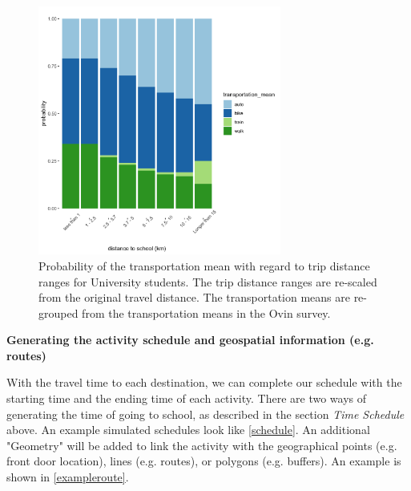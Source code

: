 \documentclass[]{article}
\begin{document}
\begin{figure}[!h]
    \centering
    \includegraphics[width=8cm]{figure/ditance_vs_transmean_Uni.png}
    \caption{Probability of the transportation mean with regard to trip distance ranges for University students. The trip distance ranges are re-scaled from the original travel distance. The transportation means are re-grouped from the transportation means in the Ovin survey.}
    \label{Uni_mode_dist}
\end{figure}

\textbf{Generating the activity schedule and geospatial information (e.g. routes)}

 With the travel time to each destination, we can complete our schedule with the starting time and the ending time of each activity. There are two ways of generating the time of going to school, as described in the section \textit{Time Schedule} above. An example simulated schedules look like \cref{schedule}. An additional "Geometry" will be added to link the activity with the geographical points (e.g. front door location), lines (e.g. routes), or polygons (e.g. buffers). An example is shown in \cref{exampleroute}.
 
\end{document}
